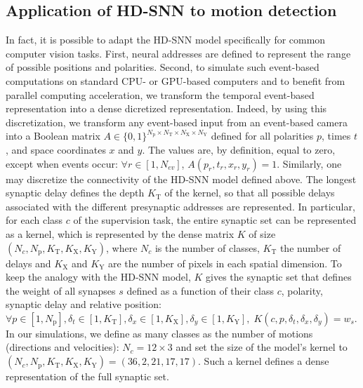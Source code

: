 \documentclass[default]{sn-jnl}%
\theoremstyle{thmstyleone}%
\theoremstyle{thmstyletwo}%
\theoremstyle{thmstylethree}%
\newcommand{\numevent}{N_{ev}} %
\newcommand{\Npol}{N_\text{p}} %
\newcommand{\arank}{r} %
\newcommand{\synapticweight}{w} %
\newcommand{\synapticdelay}{\delta} %
\newcommand{\ranksyn}{s} %
\newcommand{\timev}{t} %
\newcommand{\polev}{p} %
\newcommand{\Nx}{N_\text{X}}
\newcommand{\Ny}{N_\text{Y}}
\newcommand{\Ntime}{N_\text{T}}
\newcommand{\kernel}{K} %
\newcommand{\Kx}{K_\text{X}}
\newcommand{\Ky}{K_\text{Y}}
\newcommand{\Ktime}{K_\text{T}}
\newcommand{\class}{c} %
\newcommand{\Nclass}{N_\class} %
\begin{document}
\subsection{Application of HD-SNN to motion detection}
%
In fact, it is possible to adapt the HD-SNN model specifically for common computer vision tasks. First, neural addresses are defined to represent the range of possible positions and polarities. Second, to simulate such event-based computations on standard CPU- or GPU-based computers and to benefit from parallel computing acceleration, we transform the temporal event-based representation into a dense dicretized representation. Indeed, by using this discretization, we transform any event-based input from an event-based camera into a Boolean matrix $A \in \{0, 1 \}^{\Npol \times \Ntime \times \Nx \times \Ny}$ defined for all polarities $p$, times $t$, and space coordinates $x$ and $y$. The values are, by definition, equal to zero, except when events occur: $\forall \arank \in [1,\numevent]$, $A(\polev_\arank, t_\arank, x_\arank, y_\arank)=1$. Similarly, one may discretize the connectivity of the HD-SNN model defined above. The longest synaptic delay defines the depth $\Ktime$ of the kernel, so that all possible delays associated with the different presynaptic addresses are represented. In particular, for each class $\class$ of the supervision task, the entire synaptic set can be represented as a kernel, which is represented by the dense matrix $\kernel$ of size $(\Nclass, \Npol, \Ktime, \Kx, \Ky)$, where $\Nclass$ is the number of classes, $\Ktime$ the number of delays and $\Kx$ and $\Ky$ are the number of pixels in each spatial dimension. To keep the analogy with the HD-SNN model, $\kernel$ gives the synaptic set that defines the weight of all synapses $\ranksyn$ defined as a function of their class $\class$, polarity, synaptic delay and relative position: $\forall {\polev \in [1, \Npol], \delta_\timev \in [1, \Ktime], \delta_x \in [1, \Kx], \delta_y \in [1, \Ky]}, \; \kernel(\class, \polev, \synapticdelay_\timev, \delta_x, \delta_y) = \synapticweight_\ranksyn$. In our simulations, we define as many classes as the number of motions (directions and velocities): $\Nclass = 12 \times 3$ and set the size of the model's kernel to $(\Nclass, \Npol, \Ktime, \Kx, \Ky) = (36, 2, 21, 17, 17)$. Such a kernel defines a dense representation of the full synaptic set. %
\end{document}
